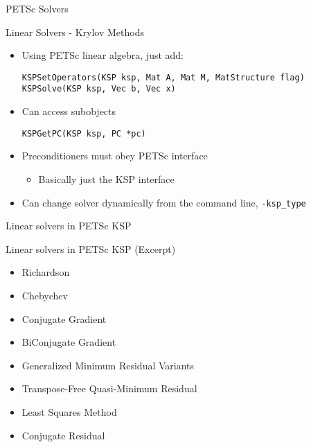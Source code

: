 \begin{frame}[fragile]{PETSc Solvers}

\begin{block}{Linear Solvers - Krylov Methods}
 \begin{itemize}
  \item Using PETSc linear algebra, just add:
  \begin{lstlisting}[basicstyle=\footnotesize\ttfamily]
KSPSetOperators(KSP ksp, Mat A, Mat M, MatStructure flag)
KSPSolve(KSP ksp, Vec b, Vec x)
  \end{lstlisting}

  \item Can access subobjects
  \begin{lstlisting}[basicstyle=\footnotesize\ttfamily]
KSPGetPC(KSP ksp, PC *pc)
  \end{lstlisting}

  \item Preconditioners must obey PETSc interface
  \begin{itemize}
    \item Basically just the KSP interface
  \end{itemize}

  \item Can change solver dynamically from the command line, \lstinline|-ksp_type|
\end{itemize}
\end{block}

\end{frame}


\begin{frame}{Linear solvers in PETSc KSP}
 \begin{block}{Linear solvers in PETSc KSP (Excerpt)}
  \begin{itemize}
  \item Richardson
  \item Chebychev
  \item Conjugate Gradient
  \item BiConjugate Gradient
  \item Generalized Minimum Residual Variants
  \item Transpose-Free Quasi-Minimum Residual
  \item Least Squares Method
  \item Conjugate Residual
  \end{itemize}
 \end{block}
\end{frame}
